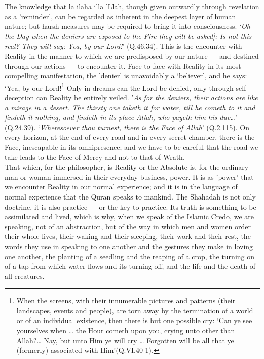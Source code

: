 \documentclass[10pt, twoside,openright]{book}
\begin{document}
The knowledge that la ilaha illa 'Llah, though given outwardly through revelation as a 'reminder', 
can be regarded as inherent in the deepest layer of human nature; but harsh measures may be required 
to bring it into consciousness. `\emph{Oh the Day when the deniers are exposed to the Fire they will be 
asked]: Is not this real? They will say: Yea, by our Lord!}' (Q.46.34). This is the encounter with 
Reality in the manner to which we are predisposed by our nature --- and destined through our actions --- 
to encounter it. Face to face with Reality in its most compelling manifestation, the 'denier' is 
unavoidably a `believer', and he says: `Yea, by our Lord!\footnote{When the screens, with their innumerable pictures and patterns (their landscapes, events and people), are torn away by the termination of a world or of an individual existence, then there is but one possible cry: `Can ye see yourselves when \ldots{} the Hour cometh upon you, crying unto other than Allah?\ldots{} Nay, but unto Him ye will cry \ldots{} Forgotten will be all that ye (formerly) associated with Him'(Q.VI.40-1).} Only in dreams can the Lord be denied, only through self\hyp{}deception can Reality be entirely veiled. '\emph{As for the deniers, their actions are like a mirage in a desert. The thirsty one taketh it for water, till he cometh to it and findeth it nothing, and findeth in its place Allah, who payeth him his due\ldots{}}' (Q.24.39). `\emph{Wheresoever thou turnest, there is the Face of Allah}' (Q.2.115). On every horizon, at the end of every road and in every secret chamber, there is the Face, inescapable in its omnipresence; and we have to be careful that the road we take leads to the Face of Mercy and not to that of Wrath. \\

That which, for the philosopher, is Reality or the Absolute is, for the ordinary man or woman 
immersed in their everyday business, power. It is as 'power' that we encounter Reality in our normal 
experience; and it is in the language of normal experience that the Quran speaks to mankind. The 
Shahadah is not only doctrine, it is also practice --- or the key to practice. Its truth is something 
to be assimilated and lived, which is why, when we speak of the Islamic Credo, we are speaking, not 
of an abstraction, but of the way in which men and women order their whole lives, their waking and 
their sleeping, their work and their rest, the words they use in speaking to one another and the 
gestures they make in loving one another, the planting of a seedling and the reaping of a crop, the 
turning on of a tap from which water flows and its turning off, and the life and the death of all 
creatures. \\
\end{document}
